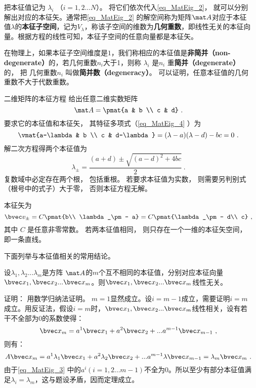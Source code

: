 {把本征值记为 $\lambda_i$ （$i = 1, 2\dots N$）。 将它们依次代入\autoref{eq_MatEig_2}， 就可以分别解出对应的本征矢。通常把\autoref{eq_MatEig_2} 的解空间称为矩阵$\mat A$对应于本征值$\lambda$的\textbf{本征子空间}，记为$V_{\lambda}$，称该子空间的维数为\textbf{几何重数}，即线性无关的本征向量。根据方程的线性可知，本征子空间的任意向量都是本征矢。

在物理上，如果本征子空间维度是$1$，我们称相应的本征值是\textbf{非简并（non-degenerate）}的，若几何重数$n_i$大于1，则称 $\lambda_i$  是$n_i$ 重\textbf{简并（degenerate）}的， 把 几何重数$n_i$ 叫做\textbf{简并数（degeneracy）}。
可以证明，任意本征值的几何重数不大于代数重数。


\begin{example}{二维矩阵的本征方程}
给出任意二维实数矩阵
\begin{equation}
\mat A = \pmat{a & b \\ c & d}~.
\end{equation}
要求它的本征值和本征矢， 其特征多项式（\autoref{eq_MatEig_4} ）为
\begin{equation}
\vmat{a-\lambda & b \\ c & d-\lambda} = (\lambda-a)(\lambda-d) - bc = 0~.
\end{equation}
解二次方程得两个本征值为
\begin{equation}
\lambda_\pm = \frac{(a + d) \pm \sqrt{(a-d)^2 + 4bc}}{2}~.
\end{equation}
复数域中必定存在两个根， 包括重根。 若要求本征值为实数， 则需要另判别式（根号中的式子）大于零， 否则本征方程无解。

本征矢为
\begin{equation}
\bvec v_\pm = C\pmat{b\\ \lambda_\pm - a} = C\pmat{\lambda_\pm - d\\ c}~,
\end{equation}
其中 $C$ 是任意非零常数。 若两本征值相同， 则只存在一个一维的本征矢空间， 即一条直线。
\end{example}
下面列举与本征值相关的常用结论。
\begin{theorem}{}\label{the_MatEig_2}
设$\lambda_1,\lambda_2...\lambda_m$是方阵 $\mat A$的$m$个互不相同的本征值，分别对应本征向量$\bvec x_1,\bvec x_2...\bvec x_m$。则$\bvec x_1,\bvec x_2...\bvec x_m$线性无关。
\end{theorem}
证明： 
用数学归纳法证明。
$m=1$显然成立。设$i=m-1$成立，需要证明$i=m$成立。用反证法，假设$i=m$时，$\bvec x_1,\bvec x_2...\bvec x_m$线性相关，设有若干不全部为0的系数使得：
\begin{equation}\label{eq_MatEig_3}
\bvec x_m=a^1\bvec x_1+a^2\bvec x_2+...a^{m-1} \bvec x_{m-1}~,
\end{equation}
则有：
\begin{equation}
 A\bvec x_m=a^1\lambda_1\bvec x_1+a^2\lambda_2\bvec x_2+...a^{m-1}\lambda \bvec x_{m-1}=\lambda_m\bvec x_m~.
\end{equation}
由于\autoref{eq_MatEig_3} 中的$a^i(i=1,2...m-1)$不全为0。所以至少有部分本征值满足$\lambda_i=\lambda_m$，这与题设矛盾，因而定理成立。

}
